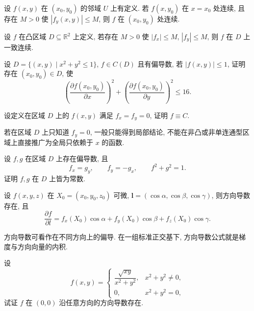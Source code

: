\documentclass[../../数学分析培优讲义.tex]{subfiles}
\begin{document}
\begin{example}
设 $f(x,y)$ 在 $(x_0,y_0)$ 的邻域 $U$ 上有定义. 若 $f(x,y_0)$ 在 $x=x_0$ 处连续, 且存在 $M>0$ 使 $|f_y(x,y)|\leq M$, 则 $f$ 在 $(x_0,y_0)$ 处连续.
\end{example}
\exampleblank

\begin{example}
设 $f$ 在凸区域 $D\subseteq\mathbb{R}^2$ 上定义, 若存在 $M>0$ 使 $|f_x|\leq M$, $|f_y|\leq M$, 则 $f$ 在 $D$ 上一致连续.
\end{example}
\exampleblank

\begin{example}
设 $D=\{(x,y)\mid x^2+y^2\leq1\}$, $f\in C(D)$ 且有偏导数, 若 $|f(x,y)|\leq1$, 证明存在 $(x_0,y_0)\in D$, 使
\[
    \left(\dfrac{\partial f(x_0,y_0)}{\partial x}\right)^2
    +\left(\dfrac{\partial f(x_0,y_0)}{\partial y}\right)^2\leq16.
\]
\end{example}
\exampleblank

\begin{example}
设定义在区域 $D$ 上的 $f(x,y)$ 满足 $f_x=f_y=0$, 证明 $f\equiv C$.
\end{example}
\exampleblank

\begin{remark}
若在区域 $D$ 上只知道 $f_y=0$, 一般只能得到局部结论, 不能在非凸或非单连通型区域上直接推广为全局只依赖于 $x$ 的函数.
\end{remark}

\begin{example}
设 $f,g$ 在区域 $D$ 上存在偏导数, 且
\[
    f_x=g_y,\qquad f_y=-g_x,\qquad f^2+g^2=1.
\]
证明 $f,g$ 在 $D$ 上皆为常数.
\end{example}
\exampleblank

\begin{theorem}[\markstar]
设 $f(x,y,z)$ 在 $X_0=(x_0,y_0,z_0)$ 可微, $\bm l=(\cos\alpha,\cos\beta,\cos\gamma)$, 则方向导数存在, 且
\[
    \dfrac{\partial f}{\partial l}
    =f_x(X_0)\cos\alpha+f_y(X_0)\cos\beta+f_z(X_0)\cos\gamma.
\]
\end{theorem}

\begin{remark}
方向导数可看作在不同方向上的偏导. 在一组标准正交基下, 方向导数公式就是梯度与方向向量的内积.
\end{remark}

\begin{example}
设
\[
    f(x,y)=
    \begin{cases}
        \dfrac{\sqrt{xy}}{x^2+y^2}, & x^2+y^2\ne0,\\
        0, & x^2+y^2=0,
    \end{cases}
\]
试证 $f$ 在 $(0,0)$ 沿任意方向的方向导数存在.
\end{example}
\exampleblank
\end{document}
